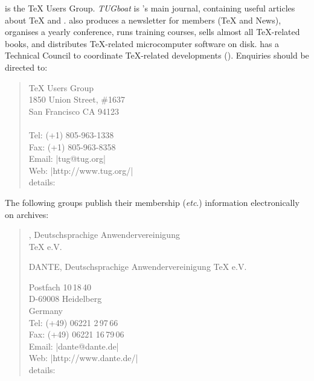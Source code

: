 %


 is the \TeX{} Users Group.  \textsl{TUGboat} is
's main journal,
containing useful articles about \TeX{} and \MF{}.  also produces a
newsletter for members (\TeX{} and  News), organises a yearly
conference, runs training courses, sells almost all \TeX{}-related
books, and distributes \TeX{}-related microcomputer software on disk. 
 has a Technical Council to  coordinate \TeX{}-related developments
().
Enquiries should be directed to:
\begin{quote}
  \TeX{} Users Group\\
  1850 Union Street, \#1637\\
  San Francisco CA 94123\\
  \\[.25\baselineskip]
  Tel: (+1) 805-963-1338\\
  Fax: (+1) 805-963-8358\\
  Email: \Email|tug@tug.org|\\
  Web: \URL|http://www.tug.org/|\\
   details: 
\end{quote}


The following groups publish their membership (\emph{etc}.) information
electronically on  archives:

\begin{quote}
  \htmlignore
  , Deutschsprachige Anwendervereinigung\\
  \hspace*{1em}\TeX{} e.V.\\
  \endhtmlignore
\begin{htmlversion}
  DANTE, Deutschsprachige Anwendervereinigung \TeX{} e.V.\\
\end{htmlversion}
  Postfach 10\,18\,40\\
  D-69008 Heidelberg\\
  Germany\\[.25\baselineskip]
  Tel: (+49) 06221 2\,97\,66\\
  Fax: (+49) 06221 16\,79\,06\\
  Email: \Email|dante@dante.de|\\
  Web: \URL|http://www.dante.de/|\\
   details: 
\end{quote}

